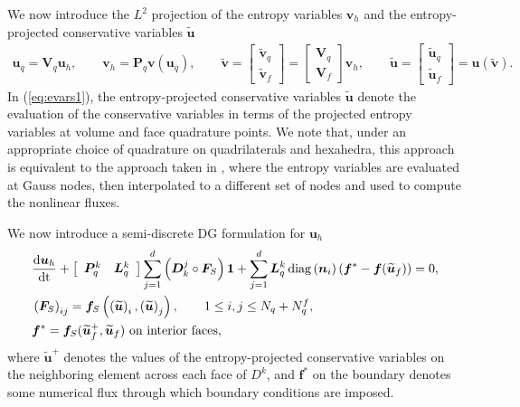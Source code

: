 \documentclass[preprint,10pt]{article}
\theoremstyle{definition}
\theoremstyle{lemma}
\theoremstyle{theorem}
\theoremstyle{assumption}
\DeclareMathOperator{\diag}{diag}
\renewcommand{\tilde}{\widetilde}
\newcommand{\td}[2]{\frac{{\rm d}#1}{{\rm d}{\rm #2}}}
\newcommand{\LRp}[1]{\left( #1 \right)}
\newcommand{\LRs}[1]{\left[ #1 \right]}
\begin{document}
{We now introduce the $L^2$ projection of the entropy variables $\bm{v}_h$ and the entropy-projected conservative variables $\tilde{\bm{u}}$ 
\begin{align}
\bm{u}_q = \bm{V}_q \bm{u}_h, \qquad \bm{v}_h = \bm{P}_q \bm{v}\LRp{\bm{u}_q}, \qquad 
\tilde{\bm{v}} = \LRs{\begin{array}{c}
\tilde{\bm{v}}_q\\
\tilde{\bm{v}}_f
\end{array}} = \LRs{\begin{array}{c}
\bm{V}_q\\
\bm{V}_f
\end{array}}\bm{v}_h, \qquad \tilde{\bm{u}} = \LRs{\begin{array}{c}
\tilde{\bm{u}}_q\\
\tilde{\bm{u}}_f
\end{array}} = \bm{u}\LRp{\tilde{\bm{v}}}.
\label{eq:evars1}
\end{align}
In (\ref{eq:evars1}), the entropy-projected conservative variables $\tilde{\bm{u}}$ denote the evaluation of the conservative variables in terms of the projected entropy variables at volume and face quadrature points.  We note that, under an appropriate choice of quadrature on quadrilaterals and hexahedra, this approach is equivalent to the approach taken in \cite{parsani2016entropy}, where the entropy variables are evaluated at Gauss nodes, then interpolated to a different set of nodes and used to compute the nonlinear fluxes.  

We now introduce a semi-discrete DG formulation for $\bm{u}_h$
\begin{align}
&\td{\bm{u}_h}{t} + \LRs{\begin{array}{cc}\bm{P}^k_q & \bm{L}^k_q\end{array}}
\sum_{j=1}^d \LRp{\bm{D}^j_k \circ \bm{F}_S}\bm{1} + \sum_{j=1}^d \bm{L}^k_q \diag\LRp{\bm{n}_i}\LRp{\bm{f}^* - \bm{f}(\tilde{\bm{u}}_f)} = 0,\label{eq:dgform1}\\
&\LRp{\bm{F}_S}_{ij} = \bm{f}_S\LRp{\LRp{\tilde{\bm{u}}}_i,\LRp{\tilde{\bm{u}}}_j}, \qquad 1 \leq i,j \leq N_q + N^f_q,\nonumber\\
&\bm{f}^* = \bm{f}_S(\tilde{\bm{u}}_f^+,\tilde{\bm{u}}_f) \text{ on interior faces},\nonumber
\end{align}
where $\tilde{\bm{u}}^+$ denotes the values of the entropy-projected conservative variables on the neighboring element across each face of $D^k$, and $\bm{f}^*$ on the boundary denotes some numerical flux through which boundary conditions are imposed.

}
\end{document}
